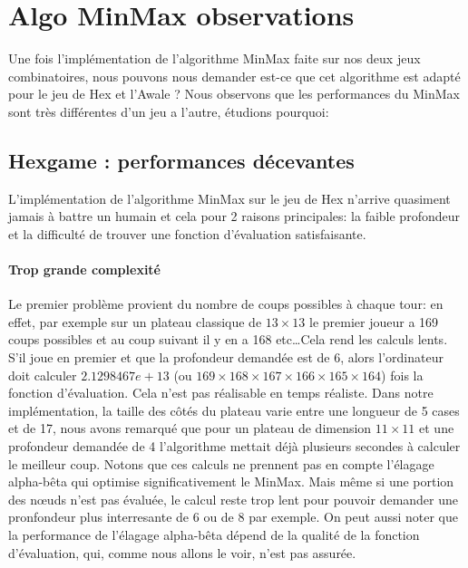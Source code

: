 




\section{Algo MinMax observations}
Une fois l'implémentation de l'algorithme MinMax faite sur nos deux
jeux combinatoires, nous pouvons nous demander est-ce que cet algorithme est adapté pour le jeu de Hex et l'Awale ?
Nous observons que les performances du MinMax sont très différentes d'un jeu a l'autre, étudions pourquoi:

\subsection{Hexgame : performances décevantes}
L'implémentation de l'algorithme MinMax sur le jeu de Hex n'arrive quasiment jamais à battre un humain et cela pour 
2 raisons principales: la faible profondeur et la difficulté de trouver une fonction d'évaluation satisfaisante.

\paragraph{Trop grande complexité} Le premier problème provient du nombre de coups possibles à chaque tour: 
en effet, par exemple sur un plateau classique de $13\times13$ le premier joueur a 169 coups possibles et au coup suivant
il y en a 168 etc\dots Cela rend les calculs lents. S'il joue en premier 
et que la profondeur demandée est de 6, alors l'ordinateur doit calculer $2.1298467e+13$ (ou $169\times168\times167\times166\times165\times164$) 
fois la fonction d'évaluation. Cela n'est pas réalisable en temps réaliste. Dans notre implémentation, la taille des côtés du plateau varie entre  
une longueur de 5 cases et de 17, nous avons remarqué que pour un plateau de dimension $11\times11$ et une profondeur demandée de 4 l'algorithme 
mettait déjà plusieurs secondes à calculer le meilleur coup. Notons que ces calculs ne prennent pas en compte l'élagage alpha-bêta
qui optimise significativement le MinMax. Mais même si une portion des nœuds n'est pas évaluée, le calcul reste trop lent pour pouvoir demander une 
pronfondeur plus interresante de 6 ou de 8 par exemple.
On peut aussi noter que la performance de l'élagage alpha-bêta dépend de la qualité de la fonction d'évaluation, qui, comme nous allons
le voir, n'est pas assurée.


